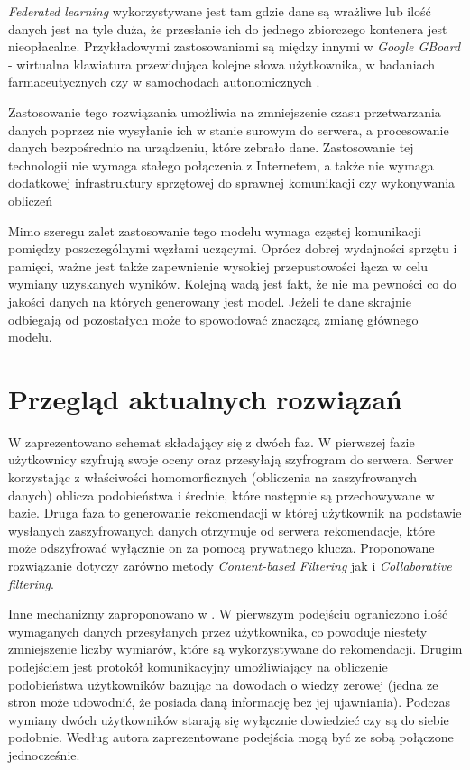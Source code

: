 \textit{Federated learning} wykorzystywane jest tam gdzie dane są wrażliwe lub ilość danych jest na tyle duża, że przesłanie ich do jednego zbiorczego kontenera jest nieopłacalne. Przykładowymi zastosowaniami są między innymi w \textit{Google GBoard} \cite{fedderatedLearning} - wirtualna klawiatura przewidująca kolejne słowa użytkownika, w badaniach farmaceutycznych \cite{fedderatedLearningHealth} czy w samochodach autonomicznych \cite{fedderatedLearningVehicle}.

Zastosowanie tego rozwiązania umożliwia na zmniejszenie czasu przetwarzania danych poprzez nie wysyłanie ich w stanie surowym do serwera, a procesowanie danych bezpośrednio na urządzeniu, które zebrało dane. Zastosowanie tej technologii nie wymaga stałego połączenia z Internetem, a także nie wymaga dodatkowej infrastruktury sprzętowej do sprawnej komunikacji czy wykonywania obliczeń

Mimo szeregu zalet zastosowanie tego modelu wymaga częstej komunikacji pomiędzy poszczególnymi węzłami uczącymi. Oprócz dobrej wydajności sprzętu i pamięci, ważne jest także zapewnienie wysokiej przepustowości łącza w celu wymiany uzyskanych wyników. Kolejną wadą jest fakt, że nie ma pewności co do jakości danych na których generowany jest model. Jeżeli te dane skrajnie odbiegają od pozostałych może to spowodować znaczącą zmianę głównego modelu.

\section{Przegląd aktualnych rozwiązań}

W \cite{practicalPrivacy} zaprezentowano schemat składający się z dwóch faz. W pierwszej fazie użytkownicy szyfrują swoje oceny oraz przesyłają szyfrogram do serwera. Serwer korzystając z właściwości homomorficznych (obliczenia na zaszyfrowanych danych) oblicza podobieństwa i średnie, które następnie są przechowywane w bazie. Druga faza to generowanie rekomendacji w której użytkownik na podstawie wysłanych zaszyfrowanych danych otrzymuje od serwera rekomendacje, które może odszyfrować wyłącznie on za pomocą prywatnego klucza. Proponowane rozwiązanie dotyczy zarówno metody \textit{Content-based Filtering} jak i \textit{Collaborative filtering}.

Inne mechanizmy zaproponowano w \cite{contributionsToSecurityRS}. W pierwszym podejściu ograniczono ilość wymaganych danych przesyłanych przez użytkownika, co powoduje niestety zmniejszenie liczby wymiarów, które są wykorzystywane do rekomendacji. Drugim podejściem jest protokół komunikacyjny umożliwiający na obliczenie podobieństwa użytkowników bazując na dowodach o wiedzy zerowej (jedna ze stron może udowodnić, że posiada daną informację bez jej ujawniania). Podczas wymiany dwóch użytkowników starają się wyłącznie dowiedzieć czy są do siebie podobnie. Według autora zaprezentowane podejścia mogą być ze sobą połączone jednocześnie.

